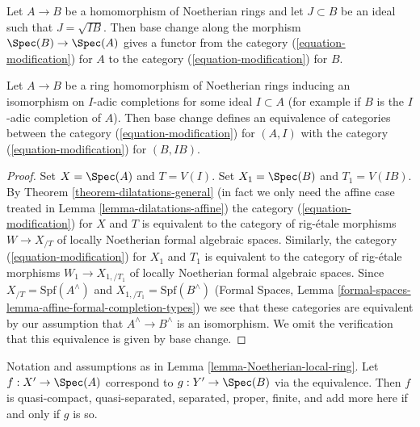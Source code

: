 \medskip\noindent
Let $A \to B$ be a homomorphism of Noetherian rings and let $J \subset B$
be an ideal such that $J = \sqrt{I B}$. Then base
change along the morphism $\Spec(B) \to \Spec(A)$ gives a functor
from the category (\ref{equation-modification}) for $A$
to the category (\ref{equation-modification}) for $B$.

\begin{lemma}
\label{lemma-Noetherian-local-ring}
Let $A \to B$ be a ring homomorphism of Noetherian rings inducing an
isomorphism on $I$-adic completions for some ideal $I \subset A$
(for example if $B$ is the $I$-adic completion of $A$).
Then base change defines an equivalence of categories between the
category (\ref{equation-modification}) for $(A, I)$
with the category (\ref{equation-modification}) for $(B, IB)$.
\end{lemma}

\begin{proof}
Set $X = \Spec(A)$ and $T = V(I)$.
Set $X_1 = \Spec(B)$ and $T_1 = V(IB)$.
By Theorem \ref{theorem-dilatations-general} (in fact we only need
the affine case treated in Lemma \ref{lemma-dilatations-affine})
the category (\ref{equation-modification}) for $X$ and $T$
is equivalent to the category of rig-\'etale morphisms
$W \to X_{/T}$ of locally Noetherian formal algebraic spaces.
Similarly, the category (\ref{equation-modification})
for $X_1$ and $T_1$ is equivalent to the category of rig-\'etale
morphisms $W_1 \to X_{1, /T_1}$ of locally Noetherian formal
algebraic spaces. Since $X_{/T} = \text{Spf}(A^\wedge)$
and $X_{1, /T_1} = \text{Spf}(B^\wedge)$ (Formal Spaces, Lemma
\ref{formal-spaces-lemma-affine-formal-completion-types}) we see that
these categories are equivalent by our assumption that
$A^\wedge \to B^\wedge$ is an isomorphism. We omit the verification
that this equivalence is given by base change.
\end{proof}

\begin{lemma}
\label{lemma-Noetherian-local-ring-properties}
Notation and assumptions as in Lemma \ref{lemma-Noetherian-local-ring}.
Let $f : X' \to \Spec(A)$ correspond to $g : Y' \to \Spec(B)$
via the equivalence. Then $f$ is quasi-compact, quasi-separated, separated,
proper, finite, and add more here if and only if $g$ is so.
\end{lemma}


